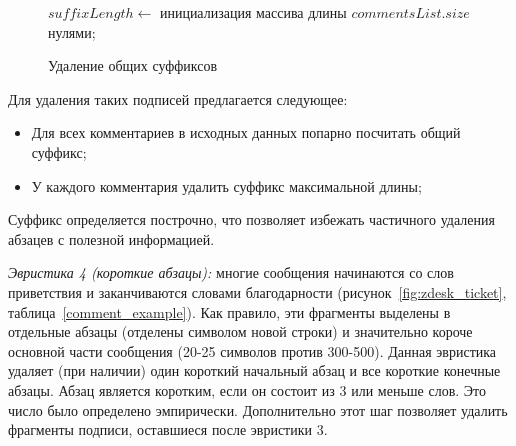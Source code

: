 \begin{figure}[tph!]
\begin{algorithm}[H]
		\SetAlgoLined
		$suffixLength \leftarrow$ инициализация массива длины $commentsList.size$ нулями;\\
		
\end{algorithm}
	\caption{Удаление общих суффиксов}
	\label{algo1}
\end{figure}
\vskip 2mm
Для удаления таких подписей предлагается следующее:

 \begin{itemize}
\item Для всех комментариев в исходных данных попарно посчитать общий суффикс;
\item У каждого комментария удалить суффикс максимальной длины;
\end{itemize}

Суффикс определяется построчно, что позволяет избежать частичного удаления абзацев с полезной информацией.

\textit{Эвристика 4 (короткие абзацы):} многие сообщения начинаются со слов приветствия и заканчиваются словами благодарности (рисунок~\ref{fig:zdesk_ticket}, таблица~\ref{comment_example}). Как правило, эти фрагменты выделены в отдельные абзацы (отделены символом новой строки) и значительно короче основной части сообщения (20-25 символов против 300-500). Данная эвристика удаляет (при наличии) один короткий начальный абзац и все короткие конечные абзацы. Абзац является коротким, если он состоит из 3 или меньше слов. Это число было определено эмпирически. Дополнительно этот шаг позволяет удалить фрагменты подписи, оставшиеся после эвристики 3.

